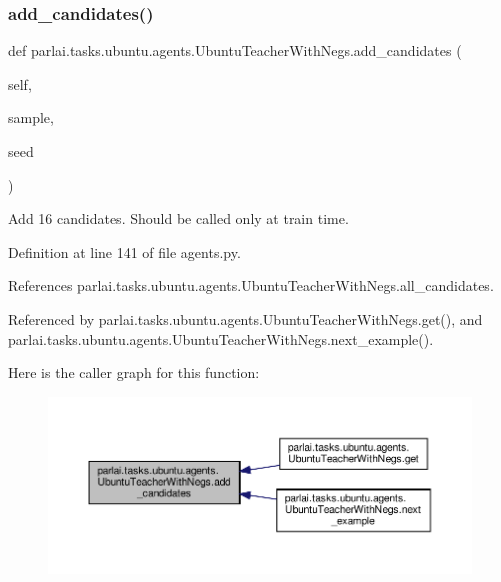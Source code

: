\subsubsection{\texorpdfstring{add\+\_\+candidates()}{add\_candidates()}}
{\footnotesize\ttfamily def parlai.\+tasks.\+ubuntu.\+agents.\+Ubuntu\+Teacher\+With\+Negs.\+add\+\_\+candidates (\begin{DoxyParamCaption}\item[{}]{self,  }\item[{}]{sample,  }\item[{}]{seed }\end{DoxyParamCaption})}

\begin{DoxyVerb}Add 16 candidates. Should be called only at train time.
\end{DoxyVerb}
 

Definition at line 141 of file agents.\+py.



References parlai.\+tasks.\+ubuntu.\+agents.\+Ubuntu\+Teacher\+With\+Negs.\+all\+\_\+candidates.



Referenced by parlai.\+tasks.\+ubuntu.\+agents.\+Ubuntu\+Teacher\+With\+Negs.\+get(), and parlai.\+tasks.\+ubuntu.\+agents.\+Ubuntu\+Teacher\+With\+Negs.\+next\+\_\+example().

Here is the caller graph for this function\+:
\nopagebreak
\begin{figure}[H]
\begin{center}
\leavevmode
\includegraphics[width=350pt]{classparlai_1_1tasks_1_1ubuntu_1_1agents_1_1UbuntuTeacherWithNegs_aca16cfaf6d38cfc93ace8445811863c3_icgraph}
\end{center}
\end{figure}
\mbox{\label{classparlai_1_1tasks_1_1ubuntu_1_1agents_1_1UbuntuTeacherWithNegs_a47304c2339835e7942ae190d4b17fc2d}} 
